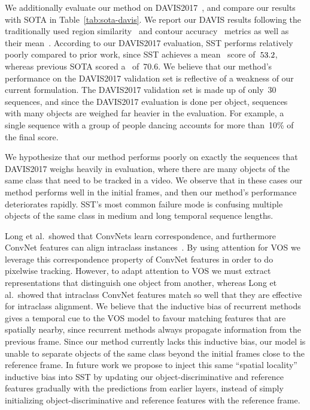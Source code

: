 We additionally evaluate our method on DAVIS2017~\citep{ponttuset2017davis}, and
compare our results with SOTA in Table~\ref{tab:sota-davis}.
We report our DAVIS results following the traditionally used region
similarity~\J{} and contour accuracy~\F{} metrics as well as their
mean~\JandF{}.
According to our DAVIS2017 evaluation, SST performs relatively poorly
compared to prior work, since SST achieves a mean~\JandF{} score
of~$53.2$, whereas previous SOTA scored a~\JandF{} of~\num{70.6}.
We believe that our method's performance on the DAVIS2017 validation set is
reflective of a weakness of our current formulation.
The DAVIS2017 validation set is made up of only~\num{30} sequences, and since
the DAVIS2017 evaluation is done per object, sequences with many objects are
weighed far heavier in the evaluation.
For example, a single sequence with a group of people dancing accounts for more
than~\num{10}\% of the final score.

We hypothesize that our method performs poorly on exactly the sequences that
DAVIS2017 weighs heavily in evaluation, where there are many objects of the
same class that need to be tracked in a video.
We observe that in these cases our method performs well in the initial frames,
and then our method's performance deteriorates rapidly.
SST's most common failure mode is confusing multiple objects of the same class
in medium and long temporal sequence lengths.

Long et al.\ showed that ConvNets learn correspondence, and furthermore ConvNet
features can align intraclass instances~\citep{long2014correspondence}.
By using attention for VOS we leverage this correspondence property of ConvNet
features in order to do pixelwise tracking.
However, to adapt attention to VOS we must extract representations that
distinguish one object from another, whereas Long et al.\ showed that
intraclass ConvNet features match so well that they are effective for
intraclass alignment.
We believe that the inductive bias of recurrent methods gives a temporal cue to
the VOS model to favour matching features that are spatially nearby, since
recurrent methods always propagate information from the previous frame.
Since our method currently lacks this inductive bias, our model is unable to
separate objects of the same class beyond the initial frames close to the
reference frame.
In future work we propose to inject this same ``spatial locality'' inductive
bias into SST by updating our object-discriminative and reference features
gradually with the predictions from earlier layers, instead of simply
initializing object-discriminative and reference features with the reference
frame.

